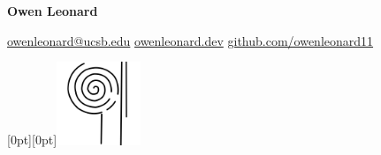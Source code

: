 \documentclass[a4paper,10pt]{article}
\begin{document}
    \begin{minipage}[t]{0.7\textwidth}
        {\LARGE \textbf{Owen Leonard}}

        \vspace{0.2cm}
        \hspace{0cm}
        {\color{PineGreen} \faEnvelope} \hspace{0.05cm} \href{mailto:owenleonard@ucsb.edu}{owenleonard@ucsb.edu} \hspace{0.3cm}
        {\color{PineGreen} \faLink} \hspace{0.05cm} \href{https://owenleonard.dev/}{owenleonard.dev} \hspace{0.3cm}
        {\color{PineGreen} \faGithub} \hspace{0.05cm} \href{https://github.com/owenleonard11}{github.com/owenleonard11} \hspace{0.3cm}
    \end{minipage}
    \begin{minipage}[t]{0.2\textwidth}
        \vspace{2cm}
        \hfill
        \raisebox{0pt}[0pt][0pt]{\includegraphics[width=2.5cm]{ologo.png}}
    \end{minipage}
\end{document}
